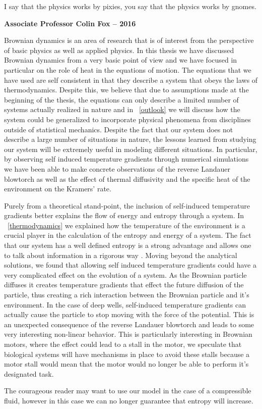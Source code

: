 \epigraph{I say that the physics works by pixies, you say that the physics works by gnomes.}{\textbf{Associate Professor Colin Fox -- 2016}}

Brownian dynamics is an area of research that is of interest from the perspective of basic physics as well as applied physics. In this thesis we have discussed Brownian dynamics from a very basic point of view and we have focused in particular on the role of heat in the equations of motion. The equations that we have used are self consistent in that they describe a system that obeys the laws of thermodynamics. Despite this, we believe that due to assumptions made at the beginning of the thesis, the equations can only describe a limited number of systems actually realized in nature and in ~\autoref{outlook} we will discuss how the system could be generalized to incorporate physical phenomena from disciplines outside of statistical mechanics. Despite the fact that our system does not describe a large number of situations in nature, the lessons learned from studying our system will be extremely useful in modeling different situations. In particular, by observing self induced temperature gradients through numerical simulations we have been able to make concrete observations of the reverse Landauer blowtorch as well as the effect of thermal diffusivity and the specific heat of the environment on the Kramers' rate.  

Purely from a theoretical stand-point, the inclusion of self-induced temperature gradients better explains the flow of energy and entropy through a system. In ~\autoref{thermodynamics} we explained how the temperature of the environment is a crucial player in the calculation of the entropy and energy of a system. The fact that our system has a well defined entropy is a strong advantage and allows one to talk about information in a rigorous way \cite{Landauer1961,MyersCelebranoKrishnan2015}. Moving beyond the analytical solutions, we found that allowing self induced temperature gradients could have a very complicated effect on the evolution of a system. As the Brownian particle diffuses it creates temperature gradients that effect the future diffusion of the particle, thus creating a rich interaction between the Brownian particle and it's environment. In the case of deep wells, self-induced temperature gradients can actually cause the particle to stop moving with the force of the potential. This is an unexpected consequence of the reverse Landauer blowtorch and leads to some very interesting non-linear behavior. This is particularly interesting in Brownian motors, where the effect could lead to a stall in the motor, we speculate that biological systems will have mechanisms in place to avoid these stalls because a motor stall would mean that the motor would no longer be able to perform it's designated task.

The courageous reader may want to use our model in the case of a compressible fluid, however in this case we can no longer guarantee that entropy will increase.